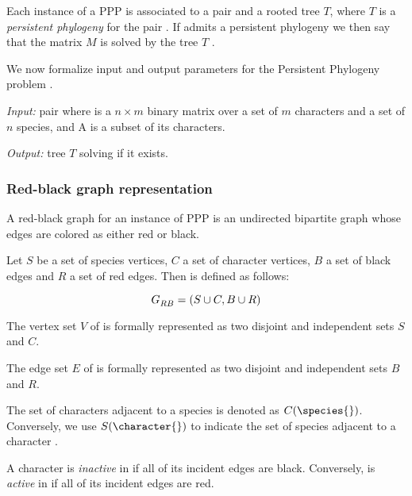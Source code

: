 Each instance of a PPP is associated to a pair \ma{} and a rooted tree $T$, where $T$ is a \emph{persistent phylogeny} for the pair \ma{}.  If \ma{} admits a persistent phylogeny we then say that the matrix $M$ is solved by the tree $T$ \cite{PPPptime2016,PPPcgraph2016}.

We now formalize input and output parameters for the Persistent Phylogeny problem \cite{PPPptime2016}.

\begin{definition}\label{definition:ppp}
  \text{}

  \textit{Input:} pair \ma{} where \m{} is a $n \times m$ binary matrix over a set of $m$ characters and a set of $n$ species, and A is a subset of its characters.

  \textit{Output:} tree $T$ solving \m{} if it exists.
\end{definition}


\subsubsection{Red-black graph representation}\label{section:grb}

A red-black graph for an instance of PPP is an undirected bipartite graph whose edges are colored as either red or black.

\begin{definition}\label{definition:grb}
  Let $S$ be a set of species vertices, $C$ a set of character vertices, $B$ a set of black edges and $R$ a set of red edges.
  Then \grb{} is defined as follows:

  \[ G_{RB}^{}{} = (S \cup C, B \cup R) \]

  The vertex set $V$ of \grb{} is formally represented as two disjoint and independent sets $S$ and $C$.

  The edge set $E$ of \grb{} is formally represented as two disjoint and independent sets $B$ and $R$.
\end{definition}

The set of characters adjacent to a species \species{} is denoted as $C(\species{})$. Conversely, we use $S(\character{})$ to indicate the set of species adjacent to a character \character{}.

A character \character{} is \emph{inactive} in \grb{} if all of its incident edges are black. Conversely, \character{} is \emph{active} in \grb{} if all of its incident edges are red.

